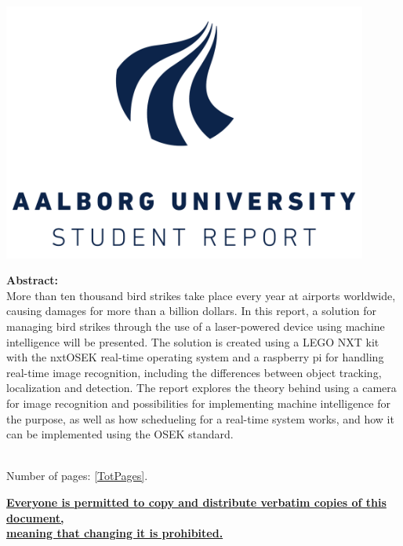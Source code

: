 \begin{minipage}[T]{0.45\textwidth}
 \begin{flushright}
  \includegraphics[width=0.9\textwidth]{images/aau_logo.pdf}\\[1.0 cm]
 \end{flushright}
 \begin{flushleft}
  \textbf{Abstract:}\\
    More than ten thousand bird strikes take place every year at airports worldwide, causing damages for more than a billion dollars. 
    In this report, a solution for managing bird strikes through the use of a laser-powered device using machine intelligence will be presented.
    The solution is created using a LEGO NXT kit with the nxtOSEK real-time operating system and a raspberry pi for handling real-time image recognition, including the differences between object tracking, localization and detection.
    The report explores the theory behind using a camera for image recognition and possibilities for implementing machine intelligence for the purpose, as well as how schedueling for a real-time system works, and how it can be implemented using the OSEK standard.


 \end{flushleft}
\end{minipage}\\
Number of pages: \ref{TotPages}.\\
\begin{center}
 \begin{scriptsize}
  \textbf{\underline{Everyone is permitted to copy and distribute verbatim copies of this document,}}\\ \textbf{\underline{ meaning that changing it is prohibited.}}
 \end{scriptsize}
\end{center}
